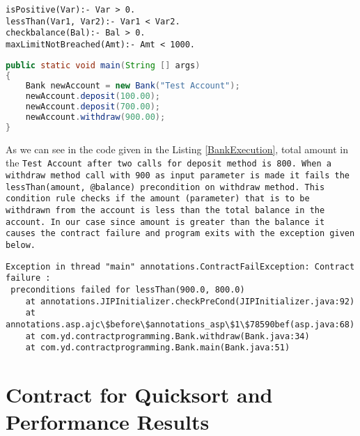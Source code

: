 \vspace{5mm}

\begin{minipage}{\linewidth}     
\begin{lstlisting}[frame=single, caption={bankprolog.pl}, label={PrologFile}, captionpos=b, breaklines=true, showstringspaces=false]
isPositive(Var):- Var > 0.
lessThan(Var1, Var2):- Var1 < Var2.
checkbalance(Bal):- Bal > 0.
maxLimitNotBreached(Amt):- Amt < 1000.
\end{lstlisting}
\end{minipage}

\vspace{8mm}

\begin{minipage}{\linewidth}       
\begin{lstlisting}[frame=single, language=Java, caption={Java Contracts for Bank class}, label={BankExecution}, captionpos=b, breaklines=true, showstringspaces=false]
public static void main(String [] args)
{
	Bank newAccount = new Bank("Test Account");
	newAccount.deposit(100.00);
	newAccount.deposit(700.00);
	newAccount.withdraw(900.00);
}
\end{lstlisting}
\end{minipage}

As we can see in the code given in the Listing \ref{BankExecution}, total amount in the \tt{Test Account} after two calls for \tt{deposit} method is 800. When a withdraw method call with 900 as input parameter is made it fails the \tt{lessThan(amount, @balance)}  precondition on withdraw method. This condition rule checks if the amount (parameter) that is to be withdrawn from the account is less than the total balance in the account. In our case since amount is greater than the balance it causes the contract failure and program exits with the exception given below. \linebreak
   
\begin{verbatim}
Exception in thread "main" annotations.ContractFailException: Contract failure :
 preconditions failed for lessThan(900.0, 800.0)
	at annotations.JIPInitializer.checkPreCond(JIPInitializer.java:92)
	at annotations.asp.ajc\$before\$annotations_asp\$1\$78590bef(asp.java:68)
	at com.yd.contractprogramming.Bank.withdraw(Bank.java:34)
	at com.yd.contractprogramming.Bank.main(Bank.java:51)

\end{verbatim}


\section{Contract for Quicksort and Performance Results}

